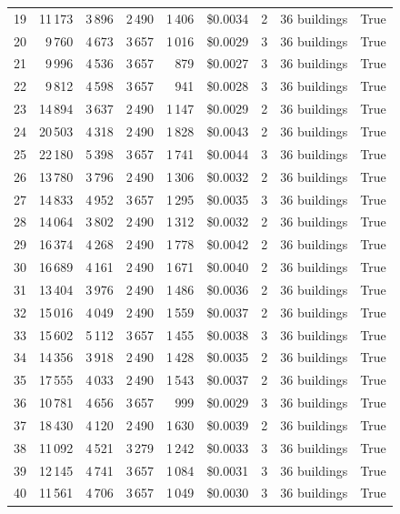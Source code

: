 \documentclass[a4paper,11pt]{article}
\begin{document}
\begin{table}[ht]
\begin{tabular}{r r r r r r r p{3cm} l}
19 & 11\,173 & 3\,896 & 2\,490 & 1\,406 & \$0.0034 & 2 & 36 buildings & True \\
20 & 9\,760 & 4\,673 & 3\,657 & 1\,016 & \$0.0029 & 3 & 36 buildings & True \\
21 & 9\,996 & 4\,536 & 3\,657 & 879 & \$0.0027 & 3 & 36 buildings & True \\
22 & 9\,812 & 4\,598 & 3\,657 & 941 & \$0.0028 & 3 & 36 buildings & True \\
23 & 14\,894 & 3\,637 & 2\,490 & 1\,147 & \$0.0029 & 2 & 36 buildings & True \\
24 & 20\,503 & 4\,318 & 2\,490 & 1\,828 & \$0.0043 & 2 & 36 buildings & True \\
25 & 22\,180 & 5\,398 & 3\,657 & 1\,741 & \$0.0044 & 3 & 36 buildings & True \\
26 & 13\,780 & 3\,796 & 2\,490 & 1\,306 & \$0.0032 & 2 & 36 buildings & True \\
27 & 14\,833 & 4\,952 & 3\,657 & 1\,295 & \$0.0035 & 3 & 36 buildings & True \\
28 & 14\,064 & 3\,802 & 2\,490 & 1\,312 & \$0.0032 & 2 & 36 buildings & True \\
29 & 16\,374 & 4\,268 & 2\,490 & 1\,778 & \$0.0042 & 2 & 36 buildings & True \\
30 & 16\,689 & 4\,161 & 2\,490 & 1\,671 & \$0.0040 & 2 & 36 buildings & True \\
31 & 13\,404 & 3\,976 & 2\,490 & 1\,486 & \$0.0036 & 2 & 36 buildings & True \\
32 & 15\,016 & 4\,049 & 2\,490 & 1\,559 & \$0.0037 & 2 & 36 buildings & True \\
33 & 15\,602 & 5\,112 & 3\,657 & 1\,455 & \$0.0038 & 3 & 36 buildings & True \\
34 & 14\,356 & 3\,918 & 2\,490 & 1\,428 & \$0.0035 & 2 & 36 buildings & True \\
35 & 17\,555 & 4\,033 & 2\,490 & 1\,543 & \$0.0037 & 2 & 36 buildings & True \\
36 & 10\,781 & 4\,656 & 3\,657 & 999 & \$0.0029 & 3 & 36 buildings & True \\
37 & 18\,430 & 4\,120 & 2\,490 & 1\,630 & \$0.0039 & 2 & 36 buildings & True \\
38 & 11\,092 & 4\,521 & 3\,279 & 1\,242 & \$0.0033 & 3 & 36 buildings & True \\
39 & 12\,145 & 4\,741 & 3\,657 & 1\,084 & \$0.0031 & 3 & 36 buildings & True \\
40 & 11\,561 & 4\,706 & 3\,657 & 1\,049 & \$0.0030 & 3 & 36 buildings & True \\

\end{tabular}
\end{table}
\end{document}
